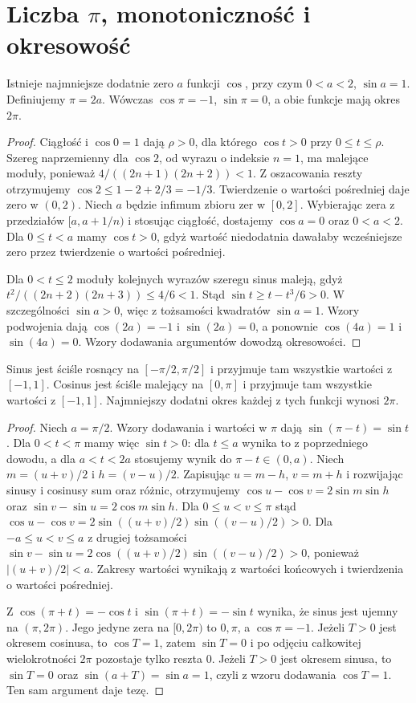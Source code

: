 \section{Liczba $\pi$, monotoniczność i okresowość}
\begin{twierdzenie}
\label{ma1:thm:pi-construction}
Istnieje najmniejsze dodatnie zero $a$ funkcji $\cos$, przy czym $0<a<2$, $\sin a=1$. Definiujemy $\pi=2a$. Wówczas $\cos\pi=-1$, $\sin\pi=0$, a obie funkcje mają okres $2\pi$.
\end{twierdzenie}
\begin{proof}
Ciągłość i $\cos0=1$ dają $\rho>0$, dla którego $\cos t>0$ przy $0\le t\le\rho$. Szereg naprzemienny dla $\cos2$, od wyrazu o indeksie $n=1$, ma malejące moduły, ponieważ $4/((2n+1)(2n+2))<1$. Z oszacowania reszty otrzymujemy $\cos2\le1-2+2/3=-1/3$. Twierdzenie o wartości pośredniej daje zero w $(0,2)$. Niech $a$ będzie infimum zbioru zer w $[0,2]$. Wybierając zera z przedziałów $[a,a+1/n)$ i stosując ciągłość, dostajemy $\cos a=0$ oraz $0<a<2$. Dla $0\le t<a$ mamy $\cos t>0$, gdyż wartość niedodatnia dawałaby wcześniejsze zero przez twierdzenie o wartości pośredniej.

Dla $0<t\le2$ moduły kolejnych wyrazów szeregu sinus maleją, gdyż $t^2/((2n+2)(2n+3))\le4/6<1$. Stąd $\sin t\ge t-t^3/6>0$. W szczególności $\sin a>0$, więc z tożsamości kwadratów $\sin a=1$. Wzory podwojenia dają $\cos(2a)=-1$ i $\sin(2a)=0$, a ponownie $\cos(4a)=1$ i $\sin(4a)=0$. Wzory dodawania argumentów dowodzą okresowości.
\end{proof}
\begin{twierdzenie}
\label{ma1:thm:trig-monotonicity}
Sinus jest ściśle rosnący na $[-\pi/2,\pi/2]$ i przyjmuje tam wszystkie wartości z $[-1,1]$. Cosinus jest ściśle malejący na $[0,\pi]$ i przyjmuje tam wszystkie wartości z $[-1,1]$. Najmniejszy dodatni okres każdej z tych funkcji wynosi $2\pi$.
\end{twierdzenie}
\begin{proof}
Niech $a=\pi/2$. Wzory dodawania i wartości w $\pi$ dają $\sin(\pi-t)=\sin t$. Dla $0<t<\pi$ mamy więc $\sin t>0$: dla $t\le a$ wynika to z poprzedniego dowodu, a dla $a<t<2a$ stosujemy wynik do $\pi-t\in(0,a)$. Niech $m=(u+v)/2$ i $h=(v-u)/2$. Zapisując $u=m-h$, $v=m+h$ i rozwijając sinusy i cosinusy sum oraz różnic, otrzymujemy $\cos u-\cos v=2\sin m\sin h$ oraz $\sin v-\sin u=2\cos m\sin h$. Dla $0\le u<v\le\pi$ stąd
$\cos u-\cos v=2\sin((u+v)/2)\sin((v-u)/2)>0$.
Dla $-a\le u<v\le a$ z drugiej tożsamości
$\sin v-\sin u=2\cos((u+v)/2)\sin((v-u)/2)>0$, ponieważ $|(u+v)/2|<a$. Zakresy wartości wynikają z wartości końcowych i twierdzenia o wartości pośredniej.

Z $\cos(\pi+t)=-\cos t$ i $\sin(\pi+t)=-\sin t$ wynika, że sinus jest ujemny na $(\pi,2\pi)$. Jego jedyne zera na $[0,2\pi)$ to $0,\pi$, a $\cos\pi=-1$. Jeżeli $T>0$ jest okresem cosinusa, to $\cos T=1$, zatem $\sin T=0$ i po odjęciu całkowitej wielokrotności $2\pi$ pozostaje tylko reszta $0$. Jeżeli $T>0$ jest okresem sinusa, to $\sin T=0$ oraz $\sin(a+T)=\sin a=1$, czyli z wzoru dodawania $\cos T=1$. Ten sam argument daje tezę.
\end{proof}
